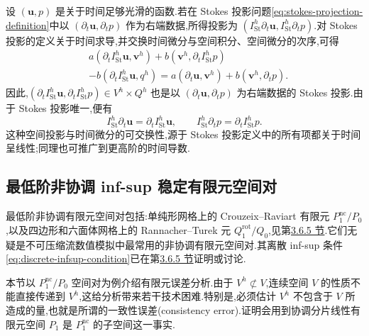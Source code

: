 \begin{note}\label{note:stokes-projection-time-derivative}
设 $(\bm{u},p)$ 是关于时间足够光滑的函数.若在 Stokes 投影问题\cref{eq:stokes-projection-definition}中以 $(\partial_t\bm{u},\partial_t p)$ 作为右端数据,所得投影为 $(I_{\mathrm{St}}^h\partial_t\bm{u},I_{\mathrm{St}}^h\partial_t p)$.对 Stokes 投影的定义关于时间求导,并交换时间微分与空间积分、空间微分的次序,可得
\[
\begin{aligned}
  &a(\partial_t I_{\mathrm{St}}^h\bm{u},\bm{v}^h)
   +b(\bm{v}^h,\partial_t I_{\mathrm{St}}^hp)\\
  &-b(\partial_t I_{\mathrm{St}}^h\bm{u},q^h)
   =a(\partial_t\bm{u},\bm{v}^h)
    +b(\bm{v}^h,\partial_t p).
\end{aligned}
\] 
因此,$(\partial_t I_{\mathrm{St}}^h\bm{u},\partial_t I_{\mathrm{St}}^hp)\in V^h\times Q^h$ 也是以 $(\partial_t\bm{u},\partial_t p)$ 为右端数据的 Stokes 投影.由于 Stokes 投影唯一,便有
\[
  I_{\mathrm{St}}^h\partial_t\bm{u}
  =\partial_t I_{\mathrm{St}}^h\bm{u},
  \qquad
  I_{\mathrm{St}}^h\partial_t p
  =\partial_t I_{\mathrm{St}}^hp.
\]
这种空间投影与时间微分的可交换性,源于 Stokes 投影定义中的所有项都关于时间呈线性;同理也可推广到更高阶的时间导数.
\end{note}

\subsection{最低阶非协调 inf-sup 稳定有限元空间对}\label{sec:stokes-lowest-order-nonconforming-pairs}

\begin{note}\label{note:stokes-lowest-order-nonconforming-pairs}
最低阶非协调有限元空间对包括:单纯形网格上的 Crouzeix--Raviart 有限元 $P_1^{\mathrm{nc}}/P_0$,以及四边形和六面体网格上的 Rannacher--Turek 元 $Q_1^{\mathrm{rot}}/Q_0$,见第\hyperref[sec:lowest-order-nonconforming]{3.6.5 节}.它们无疑是不可压缩流数值模拟中最常用的非协调有限元空间对.其离散 inf-sup 条件\cref{eq:discrete-infsup-condition}已在第\hyperref[sec:lowest-order-nonconforming]{3.6.5 节}证明或讨论.

本节以 $P_1^{\mathrm{nc}}/P_0$ 空间对为例介绍有限元误差分析.由于 $V^h\not\subset V$,连续空间 $V$ 的性质不能直接传递到 $V^h$,这给分析带来若干技术困难.特别是,必须估计 $V^h$ 不包含于 $V$ 所造成的量,也就是所谓的一致性误差(consistency error).证明会用到协调分片线性有限元空间 $P_1$ 是 $P_1^{\mathrm{nc}}$ 的子空间这一事实.
\end{note}

